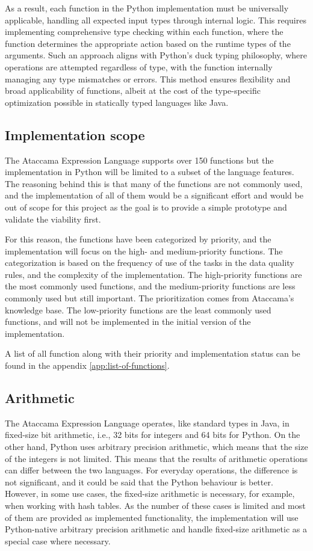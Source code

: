 As a result, each function in the Python implementation must be universally applicable, handling all expected input types through internal logic. This requires implementing comprehensive type checking within each function, where the function determines the appropriate action based on the runtime types of the arguments. Such an approach aligns with Python’s duck typing philosophy, where operations are attempted regardless of type, with the function internally managing any type mismatches or errors. This method ensures flexibility and broad applicability of functions, albeit at the cost of the type-specific optimization possible in statically typed languages like Java.

\subsection{Implementation scope}

The Ataccama Expression Language supports over 150 functions but the implementation in Python will be limited to a subset of
the language features. The reasoning behind this is that many of the functions are
not commonly used, and the implementation of all of them would be a significant
effort and would be out of scope for this project as the goal is to provide a simple
prototype and validate the viability first. 

For this reason, the functions have been categorized by priority, and the implementation will
focus on the high- and medium-priority functions. The categorization is based on the frequency of use of the tasks in the data quality rules, and the complexity of the implementation. The high-priority functions are the most commonly used functions, and the medium-priority functions are less commonly used but still important. 
The prioritization comes from Ataccama's knowledge base. The low-priority functions are the least commonly used functions, and will not be implemented in the initial version of the implementation. 

A list of all function along with their priority and implementation status can be found in the appendix \ref{app:list-of-functions}.


\subsection{Arithmetic}
The Ataccama Expression Language operates, like standard types in Java, in
fixed-size bit arithmetic, i.e., 32 bits for integers and 64 bits for Python. 
On the other hand, Python uses arbitrary precision arithmetic, which means that the size
of the integers is not limited. This means that the results of arithmetic operations
can differ between the two languages.
For everyday operations, the difference is not significant, and it could be said
that the Python behaviour is better. However, in some use cases, the fixed-size
arithmetic is necessary, for example, when working with hash tables. As the number
of these cases is limited and most of them are provided as implemented functionality,
the implementation will use Python-native arbitrary precision arithmetic and
handle fixed-size arithmetic as a special case where necessary.

